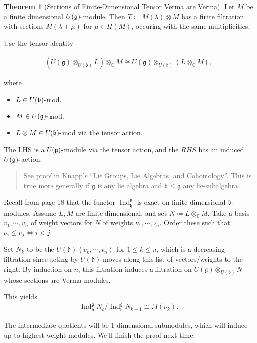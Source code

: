 \documentclass[11pt]{scrartcl}
\theoremstyle{definition}
\theoremstyle{theorem}
\newtheorem{theorem}{Theorem}[section]
\theoremstyle{proof}
\newenvironment{proof}
{\pushQED{$\qed$}\pf}
{\par\popQED\endpf}
\theoremstyle{definition}
\theoremstyle{break}
\theoremstyle{problem}
\providecommand{\tightlist}{%
  \setlength{\itemsep}{0pt}\setlength{\parskip}{0pt}}
\DeclarePairedDelimiter\qty{(}{)}
\renewcommand{\qty}[1]{{\left(  {#1} \right)}}
\def\ind{\operatorname{Ind}}
\newcommand{\CC}[0]{{\mathbb{C}}}
\newcommand{\dash}[0]{{\hbox{-}}}
\newcommand{\definedas}[0]{\coloneqq}
\newcommand{\generators}[1]{\left\langle{#1}\right\rangle}
\newcommand{\lieb}[0]{{\mathfrak{b}}}
\newcommand{\lieg}[0]{{\mathfrak{g}}}
\newcommand{\lieh}[0]{{\mathfrak{h}}}
\newcommand{\tensor}[0]{\otimes}
\renewcommand{\qed}[0]{\hfill\blacksquare}
\begin{document}
\begin{theorem}[Sections of Finite-Dimensional Tensor Verma are Verma]

Let \(M\) be a finite dimensional \(U(\lieg)\dash\)module. Then
\(T \definedas M(\lambda) \tensor M\) has a finite filtration with
sections \(M(\lambda + \mu)\) for \(\mu \in \Pi(M)\), occuring with the
same multiplicities.\end{theorem}

\begin{proof}

Use the tensor identity

\begin{align*}
\qty{ U(\lieg) \tensor_{U(\lieb)} L} \tensor_\CC M 
\cong U(\lieg)\tensor_{U(\lieb)} \qty{ L \tensor_\CC M  }
,\end{align*}

where

\begin{itemize}
\tightlist
\item
  \(L \in U(\lieb)\dash\)mod.
\item
  \(M \in U(\lieg)\dash\)mod.
\item
  \(L\tensor M \in U(\lieb)\dash\)mod via the tensor action.
\end{itemize}

The LHS is a \(U(\lieg)\dash\)module via the tensor action, and the
\(RHS\) has an induced \(U(\lieg)\dash\)action.

\begin{quote}
See proof in Knapp's ``Lie Groups, Lie Algebras, and Cohomology''. This
is true more generally if \(\lieg\) is any lie algebra and
\(\lieb\leq \lieg\) any lie-subalgebra.
\end{quote}

Recall from page 18 that the functor \(\ind_\lieh^\lieg\) is exact on
finite-dimensional \(\lieb\dash\)modules. Assume \(L, M\) are
finite-dimensional, and set \(N \definedas L \tensor_\CC M\). Take a
basis \(v_1, \cdots, v_n\) of weight vectors for \(N\) of weights
\(\nu_1, \cdots, \nu_n\). Order these such that
\(\nu_i \leq \nu_j \iff i<j\). \newline

Set \(N_k\) to be the \(U(\lieb)\generators{v_k, \cdots, v_n}\) for
\(1\leq k \leq n\), which is a decreasing filtration since acting by
\(U(\lieb)\) moves along this list of vectors/weights to the right. By
induction on \(n\), this filtration induces a filtration on
\(U(\lieg)\tensor_{U(\lieb)} N\) whose sections are Verma modules.

This yields
\begin{align*}
\ind_\lieb^\lieg N_k / \ind_\lieb^\lieg N_{k+1} \cong M(\nu_k)
.\end{align*}

The intermediate quotients will be 1-dimensional submodules, which will
induce up to highest weight modules. We'll finish the proof next
time.\end{proof}
\end{document}
